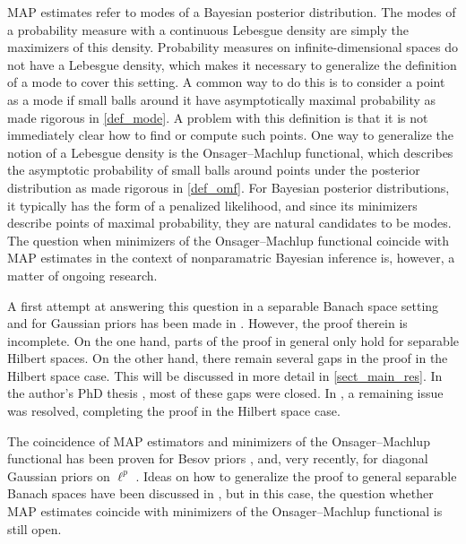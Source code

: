 \documentclass[english]{jnsao}
\theoremstyle{definition}
\begin{document}
MAP estimates refer to modes of a Bayesian posterior distribution. The modes of a probability measure with a continuous Lebesgue density are simply the maximizers of this density. Probability measures on infinite-dimensional spaces do not have a Lebesgue density, which makes it necessary to generalize the definition of a mode to cover this setting. A common way to do this is to consider a point as a mode if small balls around it have asymptotically maximal probability as made rigorous in \cref{def_mode}. A problem with this definition is that it is not immediately clear how to find or compute such points.
One way to generalize the notion of a Lebesgue density is the Onsager--Machlup functional, which describes the asymptotic probability of small balls around points under the posterior distribution as made rigorous in \cref{def_omf}. For Bayesian posterior distributions, it typically has the form of a penalized likelihood, and since its minimizers describe points of maximal probability, they are natural candidates to be modes. The question when minimizers of the Onsager--Machlup functional coincide with MAP estimates in the context of nonparamatric Bayesian inference is, however, a matter of ongoing research.

A first attempt at answering this question in a separable Banach space setting and for Gaussian priors has been made in \cite{Dashti:2013}. However, the proof therein is incomplete. On the one hand, parts of the proof in general only hold for separable Hilbert spaces. On the other hand, there remain several gaps in the proof in the Hilbert space case. This will be discussed in more detail in \cref{sect_main_res}. In the author's PhD thesis \cite{Kretschmann:2019}, most of these gaps were closed. In \cite{klebanov2022}, a remaining issue was resolved, completing the proof in the Hilbert space case.

The coincidence of MAP estimators and minimizers of the Onsager--Machlup functional has been proven for Besov priors \cite{agapiou2018}, and, very recently, for diagonal Gaussian priors on $\ell^p$ \cite{klebanov2022}. Ideas on how to generalize the proof to general separable Banach spaces have been discussed in \cite{wacker2020map}, but in this case, the question whether MAP estimates coincide with minimizers of the Onsager--Machlup functional is still open.
\end{document}
